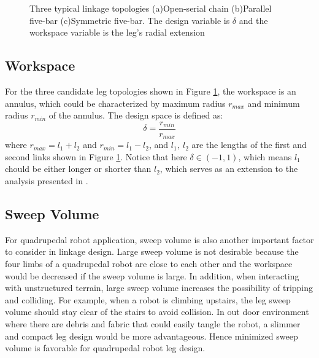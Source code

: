 \begin{figure}
	\centering
	\caption{Three typical linkage topologies (a)Open-serial chain (b)Parallel five-bar (c)Symmetric five-bar. The design variable is $\delta$ and the workspace variable is the leg's radial extension}
	\label{fig:linkages}
\end{figure}

\subsection{Workspace}
\label{sec:workspace}
 	For the three candidate leg topologies shown in Figure \ref{fig:linkages}, the workspace is an annulus, which could be characterized by maximum radius $r_{max}$ and minimum radius $r_{min}$ of the annulus. The design space is defined as:
 	\begin{equation}
 		\delta=\frac{r_{min}}{r_{max}}
 	\end{equation}
 	where $r_{max} = l_1 + l_2$ and $r_{min} = l_1 - l_2$, and $l_1,~l_2$ are the lengths of the first and second links shown in Figure \ref{fig:linkages}. Notice that here $\delta \in (-1,1)$, which means $l_1$ chould be either longer or shorter than $l_2$, which serves as an extension to the analysis presented in \cite{Kenneally2016}.
 	
\subsection{Sweep Volume}
\label{sec:sweepVolume}
	For quadrupedal robot application, sweep volume is also another important factor to consider in linkage design. Large sweep volume is not desirable because the four limbs of a quadrupedal robot are close to each other and the workspace would be decreased if the sweep volume is large. In addition, when interacting with unstructured terrain, large sweep volume increases the possibility of tripping and colliding. For example, when a robot is climbing upstairs, the leg sweep volume should stay clear of the stairs to avoid collision. In out door environment where there are debris and fabric that could easily tangle the robot, a slimmer and compact leg design would be more advantageous. Hence minimized sweep volume is favorable for quadrupedal robot leg design.

